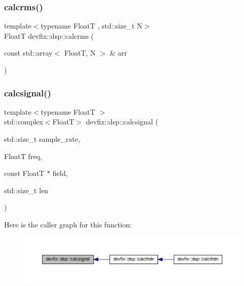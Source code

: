\subsubsection{\texorpdfstring{calcrms()}{calcrms()}\hspace{0.1cm}{\footnotesize\ttfamily [3/3]}}
{\footnotesize\ttfamily template$<$typename FloatT , std\+::size\+\_\+t N$>$ \\
FloatT devfix\+::dsp\+::calcrms (\begin{DoxyParamCaption}\item[{const std\+::array$<$ FloatT, N $>$ \&}]{arr }\end{DoxyParamCaption})}

\mbox{\label{namespacedevfix_1_1dsp_a1dc562f09e21a538a14df82aaa083526}} 
\subsubsection{\texorpdfstring{calcsignal()}{calcsignal()}\hspace{0.1cm}{\footnotesize\ttfamily [1/3]}}
{\footnotesize\ttfamily template$<$typename FloatT $>$ \\
std\+::complex$<$FloatT$>$ devfix\+::dsp\+::calcsignal (\begin{DoxyParamCaption}\item[{std\+::size\+\_\+t}]{sample\+\_\+rate,  }\item[{FloatT}]{freq,  }\item[{const FloatT $\ast$}]{field,  }\item[{std\+::size\+\_\+t}]{len }\end{DoxyParamCaption})}

Here is the caller graph for this function\+:
\nopagebreak
\begin{figure}[H]
\begin{center}
\leavevmode
\includegraphics[width=350pt]{namespacedevfix_1_1dsp_a1dc562f09e21a538a14df82aaa083526_icgraph}
\end{center}
\end{figure}
\mbox{\label{namespacedevfix_1_1dsp_aa8a0808fce2bd9ec139788f9d7fa7e59}} 
